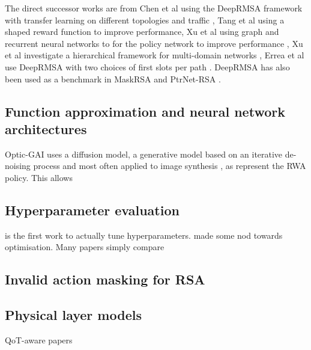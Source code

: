 The direct successor works are from Chen et al using the DeepRMSA framework with transfer learning on different topologies and traffic \cite{chen_multi-task-learning-based_2021}, Tang et al using a shaped reward function to improve performance, Xu et al using graph and recurrent neural networks to for the policy network to improve performance \cite{xu_deep_2022}, Xu et al investigate a hierarchical framework for multi-domain networks \cite{xu_hierarchical_2023}, Errea et al use DeepRMSA with two choices of first slots per path \cite{errea_deep_2023}. DeepRMSA has also been used as a benchmark in MaskRSA \cite{shimoda_mask_2021} and PtrNet-RSA \cite{cheng_ptrnet-rsa_2024}.



\subsection{Function approximation and neural network architectures}
\label{sec:survey-function_approximators}

Optic-GAI \cite{li_opticgai_2024} uses a diffusion model, a generative model based on an iterative de-noising process and most often applied to image synthesis \cite{ho_denoising_2020}, as represent the RWA policy. This allows 

\cite{suarez-varela_routing_2019} \cite{suarez-varela_graph_2023} \cite{li_gnn-based_2022} \cite{cheng_ptrnet-rsa_2024}


\subsection{Hyperparameter evaluation}

\cite{suarez-varela_routing_2019} is the first work to actually tune hyperparameters. \cite{chen_deeprmsa_2019} made some nod towards optimisation. Many papers simply compare 



\subsection{Invalid action masking for RSA}
\label{sec:survey-masking}




\subsection{Physical layer models}
\label{sec:survey-physical_layer}
QoT-aware papers


